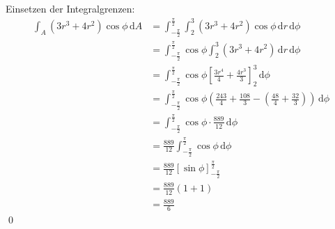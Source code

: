 \documentclass[answers]{exam}
\renewcommand{\d}{\,\mathrm{d}}
\begin{document}
\begin{questions}
\begin{solution}
        Einsetzen der Integralgrenzen:
        $$
            \begin{aligned}
                \int_A \left( 3r^3+4r^2 \right)\cos\phi \d A & = \int^{\frac{\pi}{2}}_{-\frac{\pi}{2}} \int^3_2 \left( 3r^3+4r^2 \right)\cos\phi \d r\d \phi                                                    \\
                                                             & = \int^{\frac{\pi}{2}}_{-\frac{\pi}{2}} \cos\phi \int^3_2 \left( 3r^3+4r^2 \right) \d r\d \phi                                                   \\
                                                             & = \int^{\frac{\pi}{2}}_{-\frac{\pi}{2}} \cos\phi \left[ \frac{3r^4}{4}+\frac{4r^3}{3} \right]^3_2 \d \phi                                        \\
                                                             & = \int^{\frac{\pi}{2}}_{-\frac{\pi}{2}} \cos\phi \left( \frac{243}{4} + \frac{108}{3} - \left(\frac{48}{4} + \frac{32}{3}\right) \right) \d \phi \\
                                                             & = \int^{\frac{\pi}{2}}_{-\frac{\pi}{2}} \cos\phi \cdot \frac{889}{12} \d \phi                                                                    \\
                                                             & = \frac{889}{12}\int^{\frac{\pi}{2}}_{-\frac{\pi}{2}} \cos\phi \d \phi                                                                           \\
                                                             & = \frac{889}{12} \left[\sin \phi\right]^{\frac{\pi}{2}}_{-\frac{\pi}{2}}                                                                         \\
                                                             & = \frac{889}{12} \left(1 + 1\right)                                                                                                              \\
                                                             & = \frac{889}{6}
            \end{aligned}
        $$\qed

    \end{solution}
\end{questions}
\end{document}
